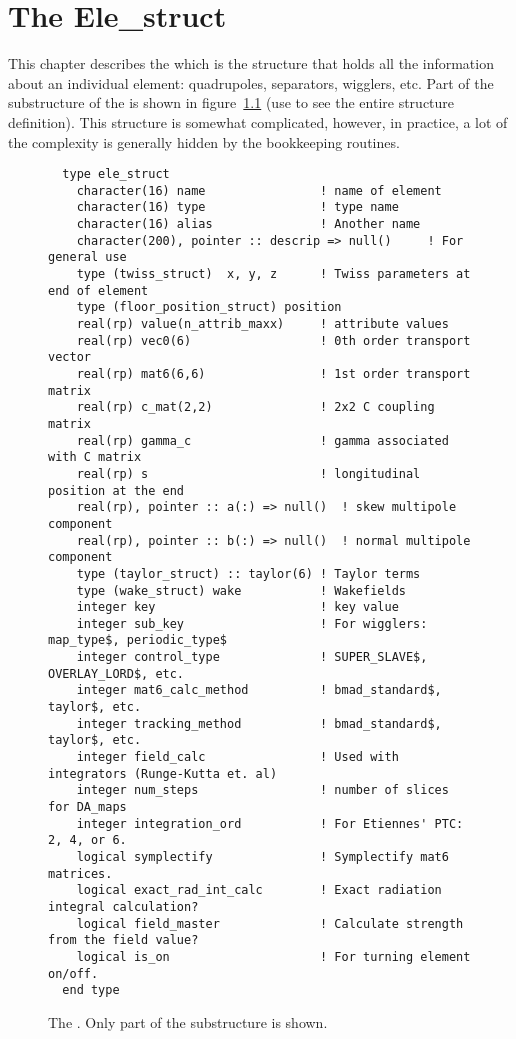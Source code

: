 \chapter{The Ele\_struct}
\label{c:ele_struct}

This chapter describes the  which is the structure that
holds all the information about an individual element: quadrupoles,
separators, wigglers, etc. 
Part of the substructure of the  is shown
in figure~\ref{f:ele_struct} (use  to see the entire structure 
definition). This structure is somewhat
complicated, however, in practice, a lot of the complexity is
generally hidden  by the \bmad bookkeeping routines.

\begin{figure}[htb]
\centering
\small
\begin{verbatim}
  type ele_struct
    character(16) name                ! name of element
    character(16) type                ! type name
    character(16) alias               ! Another name
    character(200), pointer :: descrip => null()     ! For general use
    type (twiss_struct)  x, y, z      ! Twiss parameters at end of element
    type (floor_position_struct) position
    real(rp) value(n_attrib_maxx)     ! attribute values
    real(rp) vec0(6)                  ! 0th order transport vector
    real(rp) mat6(6,6)                ! 1st order transport matrix
    real(rp) c_mat(2,2)               ! 2x2 C coupling matrix
    real(rp) gamma_c                  ! gamma associated with C matrix
    real(rp) s                        ! longitudinal position at the end
    real(rp), pointer :: a(:) => null()  ! skew multipole component
    real(rp), pointer :: b(:) => null()  ! normal multipole component
    type (taylor_struct) :: taylor(6) ! Taylor terms
    type (wake_struct) wake           ! Wakefields
    integer key                       ! key value
    integer sub_key                   ! For wigglers: map_type$, periodic_type$
    integer control_type              ! SUPER_SLAVE$, OVERLAY_LORD$, etc.
    integer mat6_calc_method          ! bmad_standard$, taylor$, etc.
    integer tracking_method           ! bmad_standard$, taylor$, etc.
    integer field_calc                ! Used with integrators (Runge-Kutta et. al)
    integer num_steps                 ! number of slices for DA_maps
    integer integration_ord           ! For Etiennes' PTC: 2, 4, or 6.
    logical symplectify               ! Symplectify mat6 matrices.
    logical exact_rad_int_calc        ! Exact radiation integral calculation?
    logical field_master              ! Calculate strength from the field value?
    logical is_on                     ! For turning element on/off.
  end type
\end{verbatim}
\caption[The .]{The . Only part of the 
  substructure is shown.}
\label{f:ele_struct}
\end{figure}

